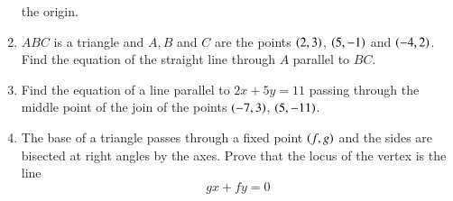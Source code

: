 \begin{enumerate}[label=\arabic*.,ref=\thesubsection.\theenumi]
the origin.
\item $ABC$ is a triangle and $A, B$ and $C$ are the points $\left(2,3\right)$, $\left(5,-1\right)$ and $\left(-4,2\right)$.  Find the equation
of the straight line through $A$ parallel to $BC$.
\item Find the equation of a line parallel to $2x+5y=11$ passing through the middle point of the join of the points $\left(-7,3\right)$, $\left(5,-11\right)$.
\item The base of a triangle passes through a fixed point $\left(f,g\right)$ and the sides are bisected at right angles by the axes.  Prove that the locus
of the vertex is the line
\begin{equation*}
gx+fy = 0
\end{equation*}
\end{enumerate}

